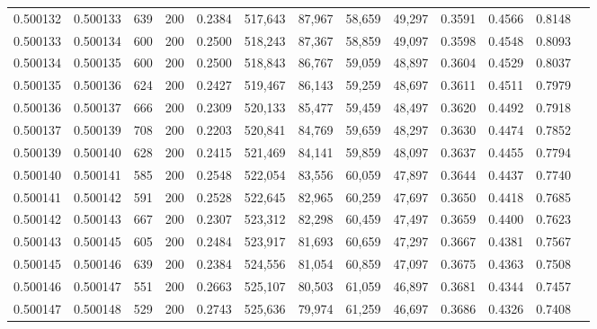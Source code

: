 \begin{tabular}{rrrrrrrrrrrrr}
0.500132 & 0.500133 &    639 & 200 &                                     0.2384 & 517,643 &  87,967 &  58,659 &  49,297 & 0.3591 & 0.4566 & 0.8148 \\
0.500133 & 0.500134 &    600 & 200 &                                     0.2500 & 518,243 &  87,367 &  58,859 &  49,097 & 0.3598 & 0.4548 & 0.8093 \\
0.500134 & 0.500135 &    600 & 200 &                                     0.2500 & 518,843 &  86,767 &  59,059 &  48,897 & 0.3604 & 0.4529 & 0.8037 \\
0.500135 & 0.500136 &    624 & 200 &                                     0.2427 & 519,467 &  86,143 &  59,259 &  48,697 & 0.3611 & 0.4511 & 0.7979 \\
0.500136 & 0.500137 &    666 & 200 &                                     0.2309 & 520,133 &  85,477 &  59,459 &  48,497 & 0.3620 & 0.4492 & 0.7918 \\
0.500137 & 0.500139 &    708 & 200 &                                     0.2203 & 520,841 &  84,769 &  59,659 &  48,297 & 0.3630 & 0.4474 & 0.7852 \\
0.500139 & 0.500140 &    628 & 200 &                                     0.2415 & 521,469 &  84,141 &  59,859 &  48,097 & 0.3637 & 0.4455 & 0.7794 \\
0.500140 & 0.500141 &    585 & 200 &                                     0.2548 & 522,054 &  83,556 &  60,059 &  47,897 & 0.3644 & 0.4437 & 0.7740 \\
0.500141 & 0.500142 &    591 & 200 &                                     0.2528 & 522,645 &  82,965 &  60,259 &  47,697 & 0.3650 & 0.4418 & 0.7685 \\
0.500142 & 0.500143 &    667 & 200 &                                     0.2307 & 523,312 &  82,298 &  60,459 &  47,497 & 0.3659 & 0.4400 & 0.7623 \\
0.500143 & 0.500145 &    605 & 200 &                                     0.2484 & 523,917 &  81,693 &  60,659 &  47,297 & 0.3667 & 0.4381 & 0.7567 \\
0.500145 & 0.500146 &    639 & 200 &                                     0.2384 & 524,556 &  81,054 &  60,859 &  47,097 & 0.3675 & 0.4363 & 0.7508 \\
0.500146 & 0.500147 &    551 & 200 &                                     0.2663 & 525,107 &  80,503 &  61,059 &  46,897 & 0.3681 & 0.4344 & 0.7457 \\
0.500147 & 0.500148 &    529 & 200 &                                     0.2743 & 525,636 &  79,974 &  61,259 &  46,697 & 0.3686 & 0.4326 & 0.7408 \\

\end{tabular}
